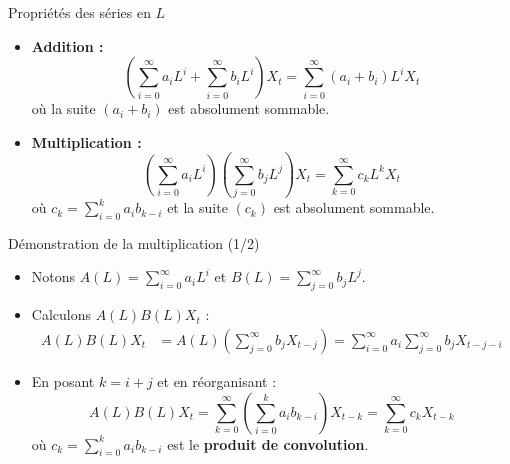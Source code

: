 \documentclass[11pt,aspectratio=169]{beamer}
\begin{document}
\begin{frame}{Propriétés des séries en $L$}

\begin{itemize}

\item \textbf{Addition :}
  \[
  \left(\sum_{i=0}^{\infty} a_i L^i + \sum_{i=0}^{\infty} b_i L^i\right) X_t = \sum_{i=0}^{\infty} (a_i + b_i) L^i X_t
  \]
  où la suite $(a_i + b_i)$ est absolument sommable.\newline

\item \textbf{Multiplication :}
  \[
  \left(\sum_{i=0}^{\infty} a_i L^i\right) \left(\sum_{j=0}^{\infty} b_j L^j\right) X_t = \sum_{k=0}^{\infty} c_k L^k X_t
  \]
  où $c_k = \sum_{i=0}^{k} a_i b_{k-i}$ et la suite $(c_k)$ est absolument sommable.

\end{itemize}

\end{frame}

\begin{frame}{Démonstration de la multiplication (1/2)}

\begin{itemize}

\item Notons $A(L) = \sum_{i=0}^{\infty} a_i L^i$ et $B(L) = \sum_{j=0}^{\infty} b_j L^j$.\newline

\item Calculons $A(L) B(L) X_t$ :
  \begin{align*}
  A(L) B(L) X_t &= A(L) \left( \sum_{j=0}^{\infty} b_j X_{t-j} \right) = \sum_{i=0}^{\infty} a_i \sum_{j=0}^{\infty} b_j X_{t-j-i}
  \end{align*}\newline

\item En posant $k = i + j$ et en réorganisant :
  \[
  A(L) B(L) X_t = \sum_{k=0}^{\infty} \left( \sum_{i=0}^{k} a_i b_{k-i} \right) X_{t-k} = \sum_{k=0}^{\infty} c_k X_{t-k}
  \]
  où $c_k = \sum_{i=0}^{k} a_i b_{k-i}$ est le \textbf{produit de convolution}.

\end{itemize}

\end{frame}
\end{document}
